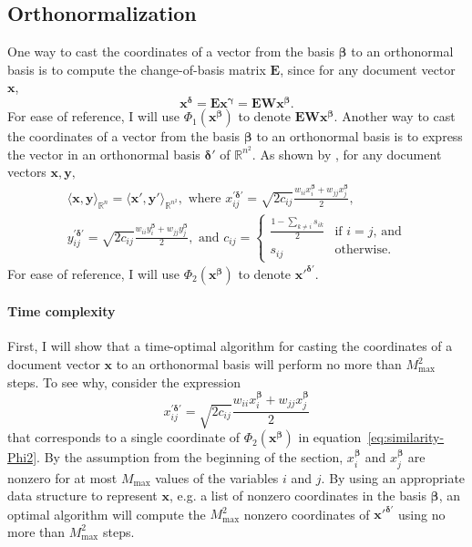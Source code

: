\documentclass[
  digital, %
  notable, %
  lof,     %
  lot,     %
  nopalatino, color
]{fithesis3}
\begin{document}
\subsection{Orthonormalization}
\label{sec:similarity-complexity-orthonormalization}
One way to cast the coordinates of a vector from the basis
$\bm\beta$ to an orthonormal basis is to compute the
change-of-basis matrix $\mathbf E$, since for any document
vector $\mathbf x$,
\begin{equation*}
  \mathbf x^{\bm\delta} = \mathbf E\mathbf x^{\bm\gamma} = \mathbf E\mathbf W\mathbf x^{\bm\beta}.
\end{equation*}
For ease of reference, I will use $\Phi_1(\mathbf
x^{\bm\beta})$ to denote $\mathbf E\mathbf W\mathbf
x^{\bm\beta}$.
Another way to cast the coordinates of a vector from the basis $\bm\beta$
to an orthonormal basis is to express the vector in an orthonormal basis
$\bm\delta'$ of $\mathbb R^{n^2}\!\!$. As shown by
\textcite[sec.~2.4]{sidorov2014soft}, for any document vectors $\mathbf x,
\mathbf y,$\begin{multline}
  \label{eq:similarity-Phi2}
  \langle\mathbf x,\mathbf y\rangle_{\mathbb R^n} = \langle\mathbf x',\mathbf y'\rangle_{\mathbb R^{n^2}},\text{ where }
  x_{ij}^{\prime\bm\delta'}=\sqrt{2c_{ij}}\frac{w_{ii}x_i^{\bm\beta}+w_{jj}x_j^{\bm\beta}}2, \\
  y_{ij}^{\prime\bm\delta'}=\sqrt{2c_{ij}}\frac{w_{ii}y_i^{\bm\beta}+w_{jj}y_j^{\bm\beta}}2,\text{ and }
  c_{ij} = \begin{cases}
    \frac{1-\sum_{k\not=i}s_{ik}}2 & \text{if }i = j\text{, and} \\
    s_{ij} & \text{otherwise}.
  \end{cases}
\end{multline}
For ease of reference, I will use $\Phi_2(\mathbf
x^{\bm\beta})$ to denote $\mathbf x'^{\bm\delta'}$.

\paragraph{Time complexity} First, I will show that a time-optimal algorithm
for casting the coordinates of a document vector $\mathbf x$ to an orthonormal
basis will perform no more than $M_{\max}^2$ steps. To see why, consider the
expression\begin{equation*}
  x_{ij}^{\prime\bm\delta'}=\sqrt{2c_{ij}}\frac{w_{ii}x_i^{\bm\beta}+w_{jj}x_j^{\bm\beta}}2
\end{equation*}
that corresponds to a single coordinate of $\Phi_2(\mathbf x^{\bm\beta})$ in
equation~\ref{eq:similarity-Phi2}. By the assumption from the beginning of the
section, $x_i^{\bm\beta}$ and $x_j^{\bm\beta}$ are nonzero for at most
$M_{\max}$ values of the variables $i$ and $j$. By using an
appropriate data structure to represent $\mathbf x$, e.g. a list of nonzero
coordinates in the basis $\bm\beta$, an optimal
algorithm will compute the $M_{\max}^2$ nonzero coordinates of $\mathbf
x'^{\bm\delta'}$ using no more than $M_{\max}^2$ steps.
\end{document}
